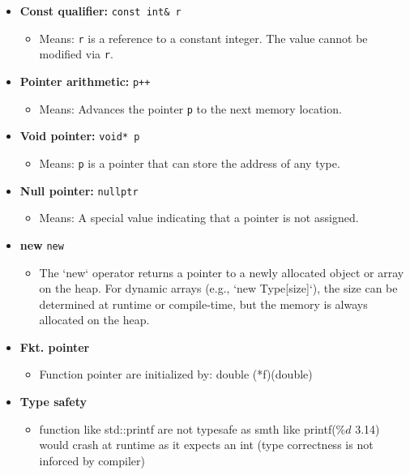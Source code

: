 \documentclass[fontsize=8pt, a4paper, landscape, fleqn]{scrartcl}
\begin{document}
\begin{multicols*}{3}[\raggedcolumns]
\begin{itemize}
    \item \textbf{Const qualifier:} \texttt{const int\& r}
    \begin{itemize}
        \item Means: \texttt{r} is a reference to a constant integer. The value cannot be modified via \texttt{r}.
    \end{itemize}
    
    \item \textbf{Pointer arithmetic:} \texttt{p++}
    \begin{itemize}
        \item Means: Advances the pointer \texttt{p} to the next memory location.
    \end{itemize}
    
    \item \textbf{Void pointer:} \texttt{void* p}
    \begin{itemize}
        \item Means: \texttt{p} is a pointer that can store the address of any type.
    \end{itemize}
    
    \item \textbf{Null pointer:} \texttt{nullptr}
    \begin{itemize}
        \item Means: A special value indicating that a pointer is not assigned.
    \end{itemize}
\item \textbf{new} \texttt{new}
\begin{itemize}
    \item The `new` operator returns a pointer to a newly allocated object or array on the heap. For dynamic arrays (e.g., `new Type[size]`), the size can be determined at runtime or compile-time, but the memory is always allocated on the heap.
\end{itemize}
    \item \textbf{Fkt. pointer}
    \begin{itemize}
        \item Function pointer are initialized by: double (*f)(double)
    \end{itemize}
    \item \textbf{Type safety}
    \begin{itemize}
        \item function like std::printf are not typesafe as smth like printf($\%d$ 3.14) would crash at runtime as it expects an int (type correctness is not inforced by compiler)
    \end{itemize}
\end{itemize}

\end{multicols*}
\end{document}
